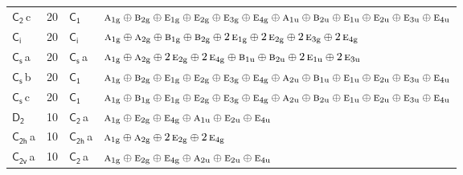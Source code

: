 \documentclass[10pt,a4paper]{article}
\numberwithin{equation}{section}
\newcommand{\grp}[1]{\mathsf{#1}}
\newcommand{\irr}[1]{\text{\normalfont\scshape #1}}
\newcommand{\ptag}[1]{\mathrm{#1}}
\newcommand{\clsletter}[1]{\,{\scriptsize\color{black!55}#1}}
\newlength{\fillwidth}\newlength{\cellwidth}\newlength{\colwidth}
\begin{document}
{\begin{longtable}{@{}lrl>{\RaggedRight\arraybackslash}p{\fillwidth}@{}}
\href{C2.pdf}{$\grp{C_{2}}$}\clsletter{c} & 20 & \href{C1.pdf}{$\grp{C_{1}}$} & $\irr{a}_{1\ptag{g}}\oplus \irr{b}_{2\ptag{g}}\oplus \irr{e}_{1\ptag{g}}\oplus \irr{e}_{2\ptag{g}}\oplus \irr{e}_{3\ptag{g}}\oplus \irr{e}_{4\ptag{g}}\oplus \irr{a}_{1\ptag{u}}\oplus \irr{b}_{2\ptag{u}}\oplus \irr{e}_{1\ptag{u}}\oplus \irr{e}_{2\ptag{u}}\oplus \irr{e}_{3\ptag{u}}\oplus \irr{e}_{4\ptag{u}}$\\
\href{S2.pdf}{$\grp{C_{i}}$} & 20 & \href{S2.pdf}{$\grp{C_{i}}$} & $\irr{a}_{1\ptag{g}}\oplus \irr{a}_{2\ptag{g}}\oplus \irr{b}_{1\ptag{g}}\oplus \irr{b}_{2\ptag{g}}\oplus 2\,\irr{e}_{1\ptag{g}}\oplus 2\,\irr{e}_{2\ptag{g}}\oplus 2\,\irr{e}_{3\ptag{g}}\oplus 2\,\irr{e}_{4\ptag{g}}$\\
\href{C1v.pdf}{$\grp{C_{s}}$}\clsletter{a} & 20 & \href{C1v.pdf}{$\grp{C_{s}}$}\clsletter{a} & $\irr{a}_{1\ptag{g}}\oplus \irr{a}_{2\ptag{g}}\oplus 2\,\irr{e}_{2\ptag{g}}\oplus 2\,\irr{e}_{4\ptag{g}}\oplus \irr{b}_{1\ptag{u}}\oplus \irr{b}_{2\ptag{u}}\oplus 2\,\irr{e}_{1\ptag{u}}\oplus 2\,\irr{e}_{3\ptag{u}}$\\
\href{C1v.pdf}{$\grp{C_{s}}$}\clsletter{b} & 20 & \href{C1.pdf}{$\grp{C_{1}}$} & $\irr{a}_{1\ptag{g}}\oplus \irr{b}_{2\ptag{g}}\oplus \irr{e}_{1\ptag{g}}\oplus \irr{e}_{2\ptag{g}}\oplus \irr{e}_{3\ptag{g}}\oplus \irr{e}_{4\ptag{g}}\oplus \irr{a}_{2\ptag{u}}\oplus \irr{b}_{1\ptag{u}}\oplus \irr{e}_{1\ptag{u}}\oplus \irr{e}_{2\ptag{u}}\oplus \irr{e}_{3\ptag{u}}\oplus \irr{e}_{4\ptag{u}}$\\
\href{C1v.pdf}{$\grp{C_{s}}$}\clsletter{c} & 20 & \href{C1.pdf}{$\grp{C_{1}}$} & $\irr{a}_{1\ptag{g}}\oplus \irr{b}_{1\ptag{g}}\oplus \irr{e}_{1\ptag{g}}\oplus \irr{e}_{2\ptag{g}}\oplus \irr{e}_{3\ptag{g}}\oplus \irr{e}_{4\ptag{g}}\oplus \irr{a}_{2\ptag{u}}\oplus \irr{b}_{2\ptag{u}}\oplus \irr{e}_{1\ptag{u}}\oplus \irr{e}_{2\ptag{u}}\oplus \irr{e}_{3\ptag{u}}\oplus \irr{e}_{4\ptag{u}}$\\
\href{D2.pdf}{$\grp{D_{2}}$} & 10 & \href{C2.pdf}{$\grp{C_{2}}$}\clsletter{a} & $\irr{a}_{1\ptag{g}}\oplus \irr{e}_{2\ptag{g}}\oplus \irr{e}_{4\ptag{g}}\oplus \irr{a}_{1\ptag{u}}\oplus \irr{e}_{2\ptag{u}}\oplus \irr{e}_{4\ptag{u}}$\\
\href{C2h.pdf}{$\grp{C_{2h}}$}\clsletter{a} & 10 & \href{C2h.pdf}{$\grp{C_{2h}}$}\clsletter{a} & $\irr{a}_{1\ptag{g}}\oplus \irr{a}_{2\ptag{g}}\oplus 2\,\irr{e}_{2\ptag{g}}\oplus 2\,\irr{e}_{4\ptag{g}}$\\
\href{C2v.pdf}{$\grp{C_{2v}}$}\clsletter{a} & 10 & \href{C2.pdf}{$\grp{C_{2}}$}\clsletter{a} & $\irr{a}_{1\ptag{g}}\oplus \irr{e}_{2\ptag{g}}\oplus \irr{e}_{4\ptag{g}}\oplus \irr{a}_{2\ptag{u}}\oplus \irr{e}_{2\ptag{u}}\oplus \irr{e}_{4\ptag{u}}$\\

\end{longtable}}
\end{document}
